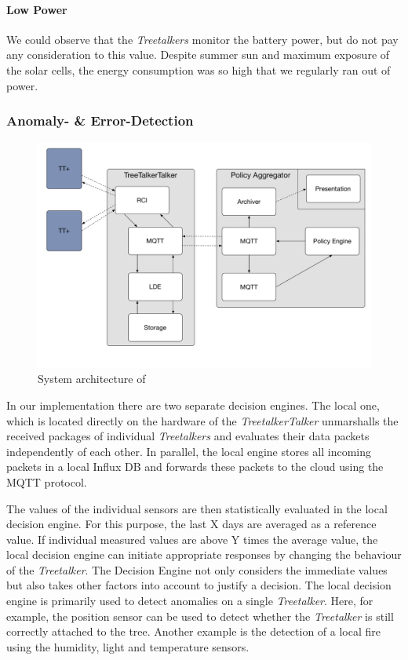 \paragraph{Low Power}
We could observe that the \textit{Treetalkers} monitor the battery power, but do not pay any consideration to this value. Despite summer sun and maximum exposure of the solar cells, the energy consumption was so high that we regularly ran out of power. 

\subsubsection{Anomaly- \& Error-Detection}
\begin{figure}
    \centering
    \includegraphics[width=.8\linewidth]{figures/TTT_architectur.pdf}
    \caption{System architecture of \ttt}
    \label{fig:ttt-architecture}
\end{figure}

In our implementation there are two separate decision engines. 
The local one, which is located directly on the hardware of the \textit{TreetalkerTalker} unmarshalls the received packages of individual \textit{Treetalkers} and evaluates their data packets independently of each other. 
In parallel, the local engine stores all incoming packets in a local Influx DB and forwards these packets to the cloud using the MQTT protocol. 

The values of the individual sensors are then statistically evaluated in the local decision engine. 
For this purpose, the last X  days are averaged as a reference value. 
If individual measured values are above Y  times the average value, the local decision engine can initiate appropriate responses by changing the behaviour of the \textit{Treetalker}. 
The Decision Engine not only considers the immediate values but also takes other factors into account to justify a decision. 
The local decision engine is primarily used to detect anomalies on a single \textit{Treetalker}. 
Here, for example, the position sensor can be used to detect whether the \textit{Treetalker} is still correctly attached to the tree. 
Another example is the detection of a local fire using the humidity, light and temperature sensors.

